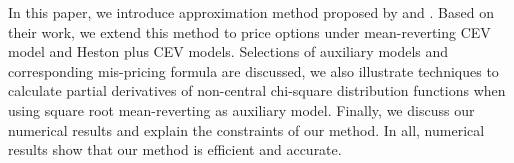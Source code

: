 In this paper, we introduce approximation method proposed by \cite{david_variance_nodate} and \cite{kristensen_adding_2011}. Based on their work, we extend this method to price options under mean-reverting CEV model and Heston plus CEV models. Selections of auxiliary models and corresponding mis-pricing formula are discussed, we also illustrate techniques to calculate partial derivatives of non-central chi-square distribution functions when using square root mean-reverting as auxiliary model. Finally, we discuss our numerical results and explain the constraints of our method. In all, numerical results show that our method is efficient and accurate.
